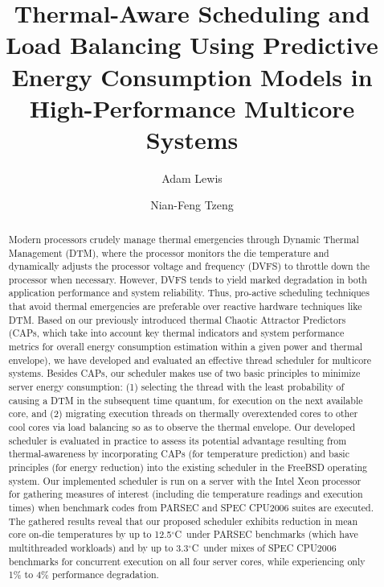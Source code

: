 \documentclass[times, 10pt,twocolumn]{IEEEtran}
\begin{document}
\title{Thermal-Aware Scheduling and Load Balancing Using Predictive
  Energy Consumption Models in High-Performance Multicore Systems} 
\author[]{Adam  Lewis} 
\author[]{Nian-Feng Tzeng} 
\maketitle
\newtheorem{defn}{Definition}
\newtheorem{thm}{Theorem}
\thispagestyle{empty}
\begin{abstract}
  Modern processors crudely manage thermal emergencies through Dynamic
  Thermal Management (DTM), where the processor monitors the die
  temperature and dynamically adjusts the processor voltage and
  frequency (DVFS) to throttle down the processor when
  necessary. However, DVFS tends to yield marked degradation in both
  application performance and system reliability. Thus, pro-active
  scheduling techniques that avoid thermal emergencies are preferable
  over reactive hardware techniques like DTM.  Based on our previously
  introduced thermal Chaotic Attractor Predictors (CAPs, which take into
  account key thermal indicators and system performance metrics for
  overall energy consumption estimation within a given power and thermal
  envelope), we have developed and evaluated an effective thread
  scheduler for multicore systems.  Besides CAPs, our scheduler makes
  use of two basic principles to minimize server energy consumption: (1)
  selecting the thread with the least probability of causing a DTM in
  the subsequent time quantum, for execution on the next available core,
  and (2) migrating execution threads on thermally overextended cores to
  other cool cores via load balancing so as to observe the thermal
  envelope.  Our developed scheduler is evaluated in practice to assess
  its potential advantage resulting from thermal-awareness by
  incorporating CAPs (for temperature prediction) and basic principles
  (for energy reduction) into the existing scheduler in the FreeBSD
  operating system.  Our implemented scheduler is run on a server with
  the Intel Xeon processor for gathering measures of interest (including
  die temperature readings and execution times) when benchmark codes
  from PARSEC and SPEC CPU2006 suites are executed.  The gathered
  results reveal that our proposed scheduler exhibits reduction in mean
  core on-die temperatures by up to 12.5$^{\circ}$C\ under PARSEC
  benchmarks (which have multithreaded workloads) and by up to 3.3$^{\circ}$C\
  under mixes of SPEC CPU2006 benchmarks for concurrent  
  execution on all four server cores, while experiencing
  only 1\% to 4\% performance degradation.
\end{abstract}
\end{document}
